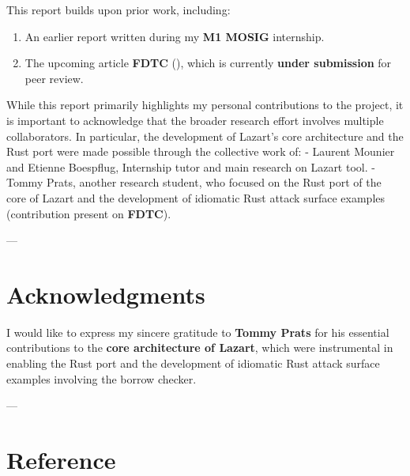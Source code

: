 \documentclass{article}
\begin{document}
This report builds upon prior work, including:
\begin{enumerate}
    \item An earlier report written during my \textbf{M1 MOSIG} internship.
    \item The upcoming article \textbf{FDTC} (\cite{fdct2026}), which is currently \textbf{under submission} for peer review.
\end{enumerate}

While this report primarily highlights my personal contributions to the project, it is important to acknowledge that the broader research effort involves multiple collaborators. In particular, the development of Lazart’s core architecture and the Rust port were made possible through the collective work of:
- Laurent Mounier and Etienne Boespflug, Internship tutor and main research on Lazart tool.
- Tommy Prats, another research student, who focused on the Rust port of the core of Lazart and the development of idiomatic Rust attack surface examples (contribution present on \textbf{FDTC}).

---

\section*{\textbf{Acknowledgments}}
I would like to express my sincere gratitude to \textbf{Tommy Prats} for his essential contributions to the \textbf{core architecture of Lazart}, which were instrumental in enabling the Rust port and the development of idiomatic Rust attack surface examples involving the borrow checker.

---
\onecolumn
\section{Reference}
\printbibliography[heading=none]




\end{document}
